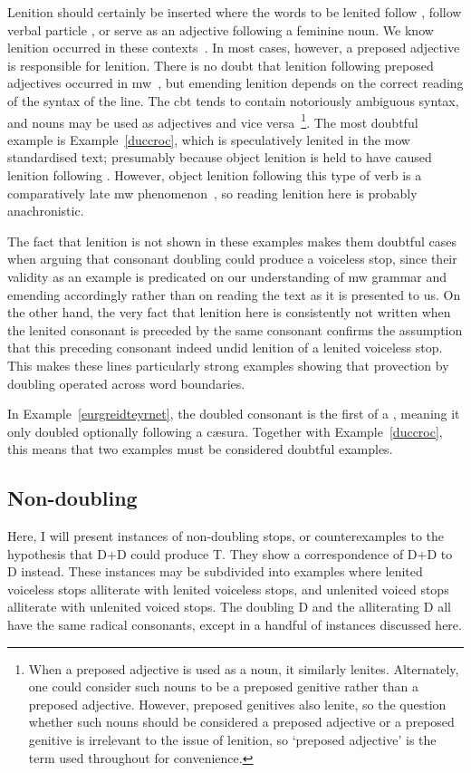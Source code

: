 Lenition should certainly be inserted where the words to be lenited follow , follow verbal particle , or serve as an adjective following a feminine noun. We know lenition occurred in these contexts~\autocite[§§~20, 22, 23]{evans_grammar_1964}. 
In most cases, however, a preposed adjective is responsible for lenition. There is no doubt that lenition following preposed adjectives occurred in \gls{mw}~\autocite[§~20]{evans_grammar_1964}, but emending lenition depends on the correct reading of the syntax of the line. The \gls{cbt} tends to contain notoriously ambiguous syntax, and nouns may be used as adjectives and vice versa~\autocite{daniel_cyfuniadau_2003}\footnote{When a preposed adjective is used as a noun, it similarly lenites. Alternately, one could consider such nouns to be a preposed genitive rather than a preposed adjective. However, preposed genitives also lenite, so the question whether such nouns should be considered a preposed adjective or a preposed genitive is irrelevant to the issue of lenition, so `preposed adjective' is the term used throughout for convenience.}. 
The most doubtful example is Example~\ref{duccroc}, which is speculatively lenited in the \gls{mow} standardised text; presumably because object lenition is held to have caused lenition following . However, object lenition following this type of verb is a comparatively late \gls{mw} phenomenon~\autocite[55-57]{van_development14}, so reading lenition here is probably anachronistic. 

The fact that lenition is not shown in these examples makes them doubtful cases when arguing that consonant doubling could produce a voiceless stop, since their validity as an example is predicated on our understanding of \gls{mw} grammar and emending accordingly rather than on reading the text as it is presented to us. On the other hand, the very fact that lenition here is consistently not written when the lenited consonant is preceded by the same consonant confirms the assumption that this preceding consonant indeed undid  lenition of a lenited voiceless stop. This makes these lines particularly strong examples showing that provection by doubling operated across word boundaries.

In Example~\ref{eurgreidteyrnet}, the doubled consonant is the first of a , meaning it only doubled optionally following a cæsura. Together with Example~\ref{duccroc}, this means that two examples must be considered doubtful examples.

\subsection{Non-doubling}
Here, I will present instances of non-doubling stops, or counterexamples to the hypothesis that \gls{D}+\gls{D} could produce \gls{T}. They show a correspondence of \gls{D}+\gls{D} to \gls{D} instead. These instances may be subdivided into examples where lenited voiceless stops alliterate with lenited voiceless stops, and unlenited voiced stops alliterate with unlenited voiced stops. The doubling \gls{D} and the alliterating \gls{D} all have the same radical consonants, except in a handful of instances discussed here.

